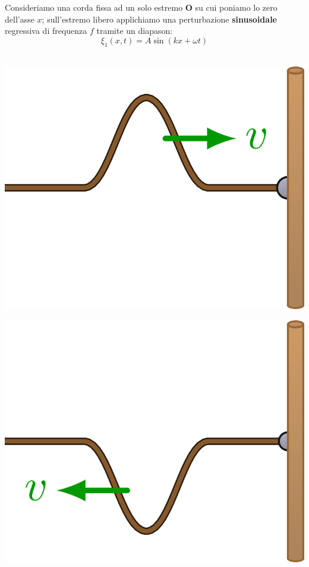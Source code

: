 \documentclass[x11names]{report}
\begin{document}
	\noindent
	Consideriamo una corda fissa ad un solo estremo \(\boldsymbol{O}\) su cui poniamo lo zero dell'asse \(x\); sull'estremo libero applichiamo una perturbazione \textbf{sinusoidale} regressiva di frequenza \(f\) tramite un diapason:
	\[ 
	\xi_1 (x,t) = A\sin\left(kx +\omega t\right) 
	\] \\
	\begin{center}
		\begin{minipage}{0.3\textwidth}
			\begin{center}
				\includegraphics[scale=0.11]{imgs/riflessa1.png}
			\end{center}
		\end{minipage}
		\begin{minipage}{0.3\textwidth}
			\begin{center}
				\includegraphics[scale=0.11]{imgs/riflessa2.png}
			\end{center}
		\end{minipage} 
	\end{center}
	
\end{document}
